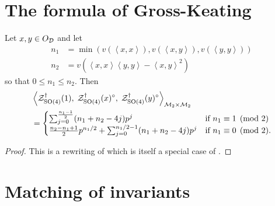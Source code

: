 \section{The formula of Gross-Keating}
\begin{proposition}
  Let $x,y \in O_\mathcal D$ and let
  \begin{align*}
    n_1 &= \min\left( v(\left\langle x,x \right\rangle), v(\left\langle x,y \right\rangle), v(\left\langle y,y \right\rangle) \right) \\
    n_2 &= v\left( \left\langle x,x \right\rangle \left\langle y,y \right\rangle - \left\langle x,y \right\rangle^2 \right)
  \end{align*}
  so that $0 \le n_1 \le n_2$.
  Then
  \begin{align*}
    &\left< \mathcal Z^{\dagger}_{\operatorname{SO}(4)}(1), \; \mathcal Z^{\dagger}_{\operatorname{SO}(4)}(x)^\circ, \; \mathcal Z^{\dagger}_{\operatorname{SO}(4)}(y)^\circ \right>_{\mathcal M_2 \times \mathcal M_2} \\
    &=
    \begin{cases}
      \sum_{j=0}^{\frac{n_1-1}{2}} (n_1+n_2-4j) p^j & \text{if } n_1 \equiv 1 \pmod 2 \\
      \frac{n_2-n_1+1}{2} p^{n_1/2} + \sum_{j=0}^{n_1/2-1} (n_1+n_2-4j) p^j & \text{if } n_1 \equiv 0 \pmod 2.
    \end{cases}
  \end{align*}
\end{proposition}
\begin{proof}
  This is a rewriting of \cite[Proposition 14.6]{ref:Kudla1997}
  which is itself a special case of \cite[Proposition 5.4]{ref:GK}.
\end{proof}

\section{Matching of invariants}
